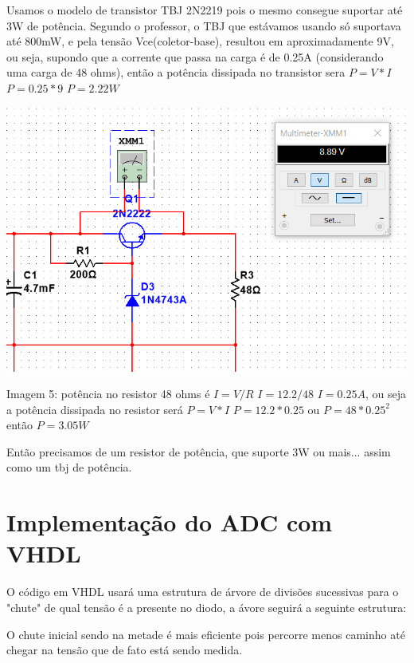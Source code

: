 \documentclass{article}
\begin{document}
Usamos o modelo de transistor TBJ 2N2219 pois o mesmo consegue suportar até 3W de potência. Segundo o professor, o TBJ que estávamos usando só suportava até 800mW, e pela tensão Vce(coletor-base), resultou em aproximadamente 9V, ou seja, supondo que a corrente que passa na carga é de 0.25A (considerando uma carga de 48 ohms), então a potência dissipada no transistor sera $P=V*I$ $P=0.25*9$ $P=2.22W$

\begin{center}
    \includegraphics[scale=0.5]{images/potenciatrans.png}
    
    Imagem 5: potência no resistor 48 ohms é $I=V/R$ $I=12.2/48$ $I=0.25A$, ou seja a potência dissipada no resistor será $P=V*I$ $P=12.2*0.25$ ou $P=48*0.25^2$ então $P=3.05W$
\end{center}

Então precisamos de um resistor de potência, que suporte 3W ou mais... assim como um tbj de potência.

\section{Implementação do ADC com VHDL}
O código em VHDL usará uma estrutura de árvore de divisões sucessivas para o "chute" de qual tensão é a presente no diodo, a ávore seguirá a seguinte estrutura:

O chute inicial sendo na metade é mais eficiente pois percorre menos caminho até chegar na tensão que de fato está sendo medida. 
\end{document}
